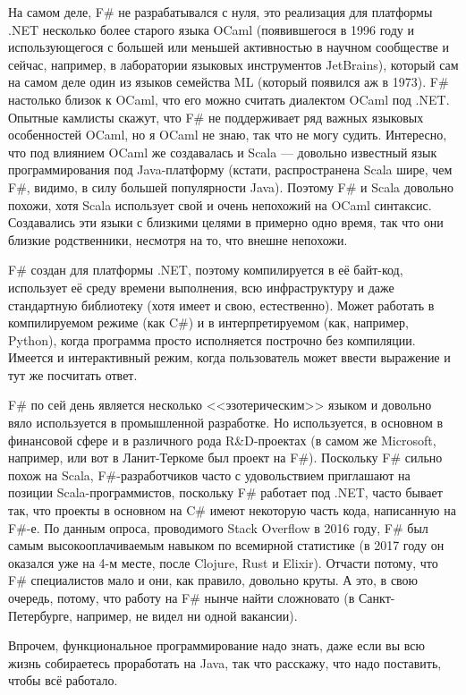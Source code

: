 \documentclass[a5paper]{article}
\begin{document}
На самом деле, F\# не разрабатывался с нуля, это реализация для платформы .NET несколько более старого языка OCaml (появившегося в 1996 году и использующегося с большей или меньшей активностью в научном сообществе и сейчас, например, в лаборатории языковых инструментов JetBrains), который сам на самом деле один из языков семейства ML (который появился аж в 1973). F\# настолько близок к OCaml, что его можно считать диалектом OCaml под .NET. Опытные камлисты скажут, что F\# не поддерживает ряд важных языковых особенностей OCaml, но я OCaml не знаю, так что не могу судить. Интересно, что под влиянием OCaml же создавалась и Scala --- довольно известный язык программирования под Java-платформу (кстати, распространена Scala шире, чем F\#, видимо, в силу большей популярности Java). Поэтому F\# и Scala довольно похожи, хотя Scala использует свой и очень непохожий на OCaml синтаксис. Создавались эти языки с близкими целями в примерно одно время, так что они близкие родственники, несмотря на то, что внешне непохожи.

F\# создан для платформы .NET, поэтому компилируется в её байт-код, использует её среду времени выполнения, всю инфраструктуру и даже стандартную библиотеку (хотя имеет и свою, естественно). Может работать в компилируемом режиме (как C\#) и в интерпретируемом (как, например, Python), когда программа просто исполняется построчно без компиляции. Имеется и интерактивный режим, когда пользователь может ввести выражение и тут же посчитать ответ.

F\# по сей день является несколько <<эзотерическим>> языком и довольно вяло используется в промышленной разработке. Но используется, в основном в финансовой сфере и в различного рода R\&D-проектах (в самом же Microsoft, например, или вот в Ланит-Теркоме был проект на F\#). Поскольку F\# сильно похож на Scala, F\#-разработчиков часто с удовольствием приглашают на позиции Scala-программистов, поскольку F\# работает под .NET, часто бывает так, что проекты в основном на C\# имеют некоторую часть кода, написанную на F\#-е. По данным опроса, проводимого Stack Overflow в 2016 году, F\# был самым высокооплачиваемым навыком по всемирной статистике (в 2017 году он оказался уже на 4-м месте, после Clojure, Rust и Elixir). Отчасти потому, что F\# специалистов мало и они, как правило, довольно круты. А это, в свою очередь, потому, что работу на F\# нынче найти сложновато (в Санкт-Петербурге, например, не видел ни одной вакансии).

Впрочем, функциональное программирование надо знать, даже если вы всю жизнь собираетесь проработать на Java, так что расскажу, что надо поставить, чтобы всё работало.
\end{document}
